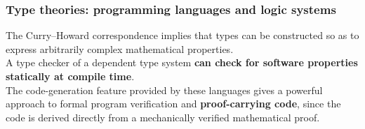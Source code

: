

\begin{frame}
\frametitle{Type theories: programming languages and logic systems}
The Curry–Howard correspondence implies that types can be constructed so as to express arbitrarily complex mathematical properties.
\\ \medskip
A type checker of a dependent type system \textbf{can check for software properties statically at compile time}.
\\ \medskip
The code-generation feature provided by these languages gives a powerful approach to formal program verification and \textbf{proof-carrying code},
since the code is derived directly from a mechanically verified mathematical proof.
\end{frame}

